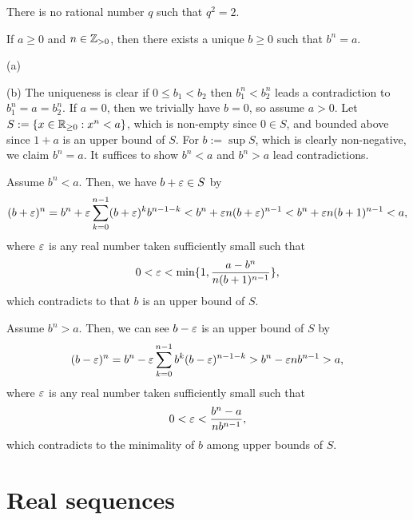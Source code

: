 \documentclass{../../large}
\begin{document}
\begin{prb}
\begin{parts}
\item There is no rational number $q$ such that $q^2=2$.
\item If $a\ge0$ and $n\in\mathbb{Z}_{>0}$, then there exists a unique $b\ge0$ such that $b^n=a$.
\end{parts}
\end{prb}
\begin{pf}
(a)

(b)
The uniqueness is clear if $0\le b_1<b_2$ then $b_1^n<b_2^n$ leads a contradiction to $b_1^n=a=b_2^n$.
If $a=0$, then we trivially have $b=0$, so assume $a>0$.
Let $S:=\{x\in\mathbb{R}_{\ge0}:x^n<a\}$, which is non-empty since $0\in S$, and bounded above since $1+a$ is an upper bound of $S$.
For $b:=\sup S$, which is clearly non-negative, we claim $b^n=a$.
It suffices to show $b^n<a$ and $b^n>a$ lead contradictions.

Assume $b^n<a$.
Then, we have $b+\varepsilon\in S$ by
\[(b+\varepsilon)^n=b^n+\varepsilon\sum_{k=0}^{n-1}(b+\varepsilon)^kb^{n-1-k}<b^n+\varepsilon n(b+\varepsilon)^{n-1}<b^n+\varepsilon n(b+1)^{n-1}<a,\]
where $\varepsilon$ is any real number taken sufficiently small such that
\[0<\varepsilon<\min\{1,\frac{a-b^n}{n(b+1)^{n-1}}\},\]
which contradicts to that $b$ is an upper bound of $S$.

Assume $b^n>a$.
Then, we can see $b-\varepsilon$ is an upper bound of $S$ by
\[(b-\varepsilon)^n=b^n-\varepsilon\sum_{k=0}^{n-1}b^k(b-\varepsilon)^{n-1-k}>b^n-\varepsilon nb^{n-1}>a,\]
where $\varepsilon$ is any real number taken sufficiently small such that
\[0<\varepsilon<\frac{b^n-a}{nb^{n-1}},\]
which contradicts to the minimality of $b$ among upper bounds of $S$.
\end{pf}


\begin{prb}
\end{prb}




\section{Real sequences}
\end{document}
